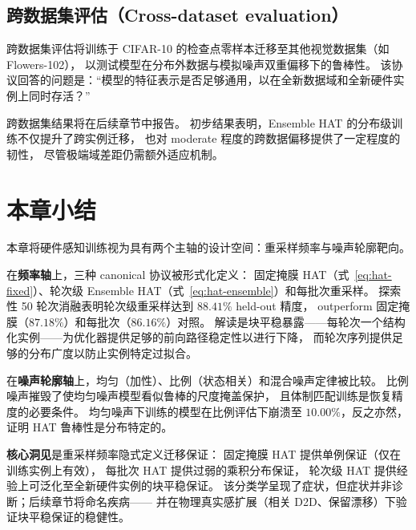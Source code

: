 \subsection{跨数据集评估（Cross-dataset evaluation）}

跨数据集评估将训练于 CIFAR-10 的检查点零样本迁移至其他视觉数据集（如 Flowers-102），
以测试模型在分布外数据与模拟噪声双重偏移下的鲁棒性。
该协议回答的问题是：``模型的特征表示是否足够通用，以在全新数据域和全新硬件实例上同时存活？''

跨数据集结果将在后续章节中报告。
初步结果表明，Ensemble HAT 的分布级训练不仅提升了跨实例迁移，
也对 moderate 程度的跨数据偏移提供了一定程度的韧性，
尽管极端域差距仍需额外适应机制。

\section{本章小结}

本章将硬件感知训练视为具有两个主轴的设计空间：重采样频率与噪声轮廓靶向。

在\textbf{频率轴}上，三种 canonical 协议被形式化定义：
固定掩膜 HAT（式~\ref{eq:hat-fixed}）、轮次级 Ensemble HAT（式~\ref{eq:hat-ensemble}）和每批次重采样。
探索性 50 轮次消融表明轮次级重采样达到 $88.41\%$ held-out 精度，
outperform 固定掩膜（$87.18\%$）和每批次（$86.16\%$）对照。
解读是块平稳暴露——每轮次一个结构化实例——为优化器提供足够的前向路径稳定性以进行下降，
而轮次序列提供足够的分布广度以防止实例特定过拟合。

在\textbf{噪声轮廓轴}上，均匀（加性）、比例（状态相关）和混合噪声定律被比较。
比例噪声摧毁了使均匀噪声模型看似鲁棒的尺度掩盖保护，
且体制匹配训练是恢复精度的必要条件。
均匀噪声下训练的模型在比例评估下崩溃至 $10.00\%$，反之亦然，
证明 HAT 鲁棒性是分布特定的。

\textbf{核心洞见}是重采样频率隐式定义迁移保证：
固定掩膜 HAT 提供单例保证（仅在训练实例上有效），
每批次 HAT 提供过弱的乘积分布保证，
轮次级 HAT 提供经验上可泛化至全新硬件实例的块平稳保证。
该分类学呈现了症状，但症状并非诊断；后续章节将命名疾病——
并在物理真实感扩展（相关 D2D、保留漂移）下验证块平稳保证的稳健性。
